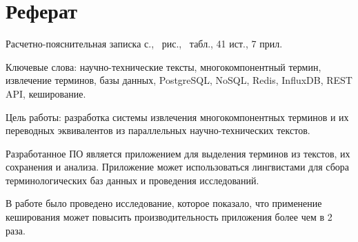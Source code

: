 \section*{Реферат}

Расчетно-пояснительная записка \pageref{LastPage} с., \totalfigures\ рис., \totaltables\ табл., 41 ист., 7 прил.

Ключевые слова: научно-технические тексты, многокомпонентный термин, извлечение терминов, базы данных, PostgreSQL, NoSQL, Redis, InfluxDB, REST API, кеширование.


Цель работы: разработка системы извлечения многокомпонентных терминов и их переводных эквивалентов из параллельных научно-технических текстов.

Разработанное ПО является приложением для выделения терминов из текстов, их сохранения и анализа. Приложение может использоваться лингвистами для сбора терминологических баз данных и проведения исследований.

В работе было проведено исследование, которое показало, что применение кеширования может повысить производительность приложения более чем в 2 раза.



\pagebreak